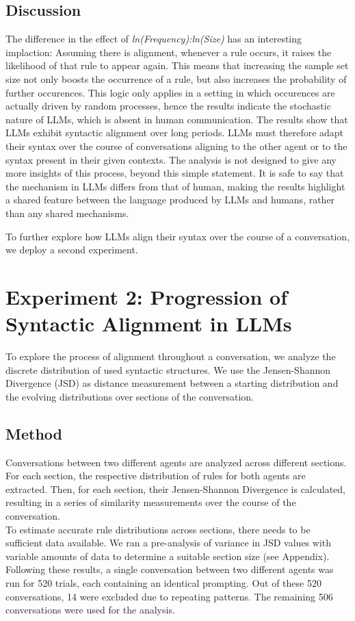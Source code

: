 \documentclass[11pt]{article}
\begin{document}
\subsection{Discussion}


The difference in the effect of \textit{ln(Frequency):ln(Size)} has an interesting implaction: Assuming there is alignment, whenever a rule occurs, it raises the likelihood of that rule to appear again. This means that increasing the sample set size not only boosts the occurrence of a rule, but also increases the probability of further occurences. This logic only applies in a setting in which occurences are actually driven by random processes, hence the results indicate the stochastic nature of LLMs, which is absent in human communication.
The results show that LLMs exhibit syntactic alignment over long periods.
LLMs must therefore adapt their syntax over the course of conversations aligning to the other agent or to the syntax present in their given contexts. The analysis is not designed to give any more insights of this process, beyond this simple statement. It is safe to say that the mechanism in LLMs differs from that of human, making the results highlight a shared feature between the language produced by LLMs and humans, rather than any shared mechanisms.

To further explore how LLMs align their syntax over the course of a conversation, we deploy a second experiment.

\section{Experiment 2: Progression of Syntactic Alignment in LLMs}

To explore the process of alignment throughout a conversation, we analyze the discrete distribution of used syntactic structures. We use the Jensen-Shannon Divergence (JSD) as distance measurement between a starting distribution and the evolving distributions over sections of the conversation.
\subsection{Method}
Conversations between two different agents are analyzed across different sections. For each section, the respective distribution of rules for both agents are extracted. Then, for each section, their Jensen-Shannon Divergence is calculated, resulting in a series of similarity measurements over the course of the conversation.\\
To estimate accurate rule distributions across sections, there needs to be sufficient data available. We ran a pre-analysis of variance in JSD values with variable amounts of data to determine a suitable section size (see Appendix). Following these results, a single conversation between two different agents was run for 520 trials, each containing an identical prompting. Out of these 520 conversations, 14 were excluded due to repeating patterns. The remaining 506 conversations were used for the analysis.
\end{document}
